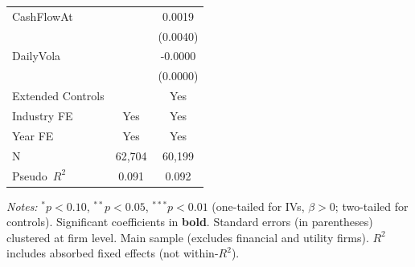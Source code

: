 \begin{landscape}
\begin{table}[H]
\begin{tabular}{lcc}
CashFlowAt &  & 0.0019 \\
 &  & (0.0040) \\
DailyVola &  & -0.0000 \\
 &  & (0.0000) \\
\midrule
Extended Controls &  & Yes \\
Industry FE & Yes & Yes \\
Year FE & Yes & Yes \\
\midrule
N & 62,704 & 60,199 \\
Pseudo~$R^2$ & 0.091 & 0.092 \\
\bottomrule
\end{tabular}
\begin{minipage}{\linewidth}
\vspace{2pt}\scriptsize
\textit{Notes:} $^{*}p<0.10$, $^{**}p<0.05$, $^{***}p<0.01$ (one-tailed for IVs, $\beta > 0$; two-tailed for controls).
 Significant coefficients in \textbf{bold}.
 Standard errors (in parentheses) clustered at firm level.
 Main sample (excludes financial and utility firms).
 $R^2$ includes absorbed fixed effects (not within-$R^2$).
\end{minipage}
\end{table}
\end{landscape}